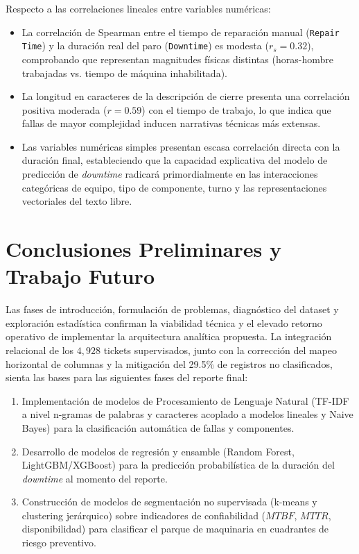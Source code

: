 \documentclass[conference]{IEEEtran}
\begin{document}
Respecto a las correlaciones lineales entre variables numéricas:
\begin{itemize}
    \item La correlación de Spearman entre el tiempo de reparación manual (\texttt{Repair Time}) y la duración real del paro (\texttt{Downtime}) es modesta ($r_s = 0.32$), comprobando que representan magnitudes físicas distintas (horas-hombre trabajadas vs. tiempo de máquina inhabilitada).
    \item La longitud en caracteres de la descripción de cierre presenta una correlación positiva moderada ($r = 0.59$) con el tiempo de trabajo, lo que indica que fallas de mayor complejidad inducen narrativas técnicas más extensas.
    \item Las variables numéricas simples presentan escasa correlación directa con la duración final, estableciendo que la capacidad explicativa del modelo de predicción de \textit{downtime} radicará primordialmente en las interacciones categóricas de equipo, tipo de componente, turno y las representaciones vectoriales del texto libre.
\end{itemize}

\section{Conclusiones Preliminares y Trabajo Futuro}
Las fases de introducción, formulación de problemas, diagnóstico del dataset y exploración estadística confirman la viabilidad técnica y el elevado retorno operativo de implementar la arquitectura analítica propuesta. La integración relacional de los $4,928$ tickets supervisados, junto con la corrección del mapeo horizontal de columnas y la mitigación del 29.5\% de registros no clasificados, sienta las bases para las siguientes fases del reporte final:
\begin{enumerate}
    \item Implementación de modelos de Procesamiento de Lenguaje Natural (TF-IDF a nivel n-gramas de palabras y caracteres acoplado a modelos lineales y Naive Bayes) para la clasificación automática de fallas y componentes.
    \item Desarrollo de modelos de regresión y ensamble (Random Forest, LightGBM/XGBoost) para la predicción probabilística de la duración del \textit{downtime} al momento del reporte.
    \item Construcción de modelos de segmentación no supervisada (k-means y clustering jerárquico) sobre indicadores de confiabilidad ($MTBF$, $MTTR$, disponibilidad) para clasificar el parque de maquinaria en cuadrantes de riesgo preventivo.
\end{enumerate}
\end{document}
